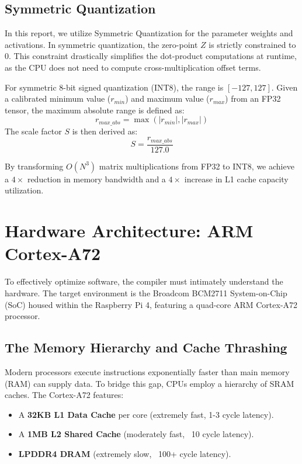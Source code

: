 \subsection{Symmetric Quantization}
In this report, we utilize Symmetric Quantization for the parameter weights and activations. In symmetric quantization, the zero-point $Z$ is strictly constrained to 0. This constraint drastically simplifies the dot-product computations at runtime, as the CPU does not need to compute cross-multiplication offset terms.

For symmetric 8-bit signed quantization (INT8), the range is $[-127, 127]$. Given a calibrated minimum value ($r_{min}$) and maximum value ($r_{max}$) from an FP32 tensor, the maximum absolute range is defined as:
\begin{equation}
r_{max\_abs} = \max(|r_{min}|, |r_{max}|)
\end{equation}
The scale factor $S$ is then derived as:
\begin{equation}
S = \frac{r_{max\_abs}}{127.0}
\end{equation}

By transforming $O(N^3)$ matrix multiplications from FP32 to INT8, we achieve a $4\times$ reduction in memory bandwidth and a $4\times$ increase in L1 cache capacity utilization.

\section{Hardware Architecture: ARM Cortex-A72}
To effectively optimize software, the compiler must intimately understand the hardware. The target environment is the Broadcom BCM2711 System-on-Chip (SoC) housed within the Raspberry Pi 4, featuring a quad-core ARM Cortex-A72 processor.

\subsection{The Memory Hierarchy and Cache Thrashing}
Modern processors execute instructions exponentially faster than main memory (RAM) can supply data. To bridge this gap, CPUs employ a hierarchy of SRAM caches.
The Cortex-A72 features:
\begin{itemize}
    \item A \textbf{32KB L1 Data Cache} per core (extremely fast, 1-3 cycle latency).
    \item A \textbf{1MB L2 Shared Cache} (moderately fast, ~10 cycle latency).
    \item \textbf{LPDDR4 DRAM} (extremely slow, ~100+ cycle latency).
\end{itemize}

